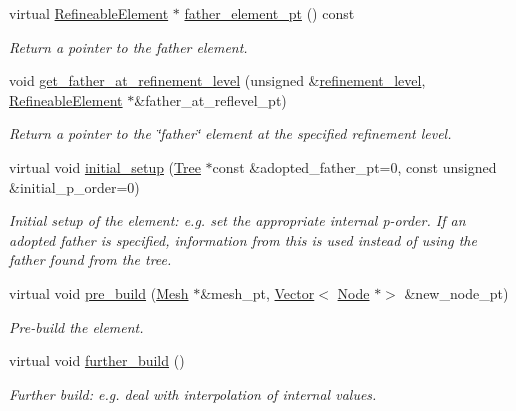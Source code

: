 \begin{DoxyCompactItemize}
virtual \hyperlink{classoomph_1_1RefineableElement}{Refineable\+Element} $\ast$ \hyperlink{classoomph_1_1RefineableElement_aa15517a39ebe72b751b514081f6eba60}{father\+\_\+element\+\_\+pt} () const
\begin{DoxyCompactList}\small\item\em Return a pointer to the father element. \end{DoxyCompactList}\item 
void \hyperlink{classoomph_1_1RefineableElement_a6ade15684ccece690c3ba8aebcc02797}{get\+\_\+father\+\_\+at\+\_\+refinement\+\_\+level} (unsigned \&\hyperlink{classoomph_1_1RefineableElement_a6b9153d7933baf6092febaca278a6fc7}{refinement\+\_\+level}, \hyperlink{classoomph_1_1RefineableElement}{Refineable\+Element} $\ast$\&father\+\_\+at\+\_\+reflevel\+\_\+pt)
\begin{DoxyCompactList}\small\item\em Return a pointer to the \char`\"{}father\char`\"{} element at the specified refinement level. \end{DoxyCompactList}\item 
virtual void \hyperlink{classoomph_1_1RefineableElement_a61ae74d94be7abc7231f34f3322f8e13}{initial\+\_\+setup} (\hyperlink{classoomph_1_1Tree}{Tree} $\ast$const \&adopted\+\_\+father\+\_\+pt=0, const unsigned \&initial\+\_\+p\+\_\+order=0)
\begin{DoxyCompactList}\small\item\em Initial setup of the element\+: e.\+g. set the appropriate internal p-\/order. If an adopted father is specified, information from this is used instead of using the father found from the tree. \end{DoxyCompactList}\item 
virtual void \hyperlink{classoomph_1_1RefineableElement_ab30d66018b994b03731e2942f6a15f36}{pre\+\_\+build} (\hyperlink{classoomph_1_1Mesh}{Mesh} $\ast$\&mesh\+\_\+pt, \hyperlink{classoomph_1_1Vector}{Vector}$<$ \hyperlink{classoomph_1_1Node}{Node} $\ast$$>$ \&new\+\_\+node\+\_\+pt)
\begin{DoxyCompactList}\small\item\em Pre-\/build the element. \end{DoxyCompactList}\item 
virtual void \hyperlink{classoomph_1_1RefineableElement_a26628ce36dfad028686adeb4694a9ef3}{further\+\_\+build} ()
\begin{DoxyCompactList}\small\item\em Further build\+: e.\+g. deal with interpolation of internal values. \end{DoxyCompactList}\item 
$$
\end{DoxyCompactItemize}
